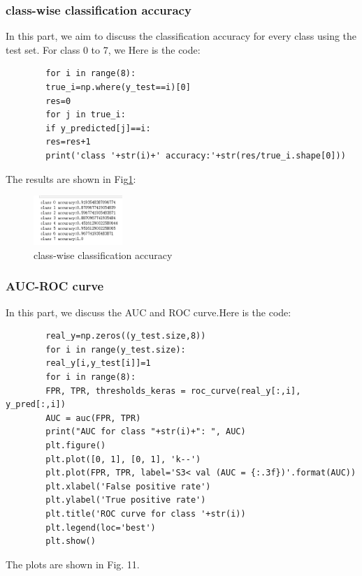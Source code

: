 \documentclass[conference]{IEEEtran}
\begin{document}
	\subsubsection{class-wise classification accuracy}
	In this part, we aim to discuss the classification accuracy for every class using the test set. For class 0 to 7, we 
    Here is the code:
	\begin{lstlisting}
		for i in range(8):
		true_i=np.where(y_test==i)[0]
		res=0
		for j in true_i:
		if y_predicted[j]==i:
		res=res+1
		print('class '+str(i)+' accuracy:'+str(res/true_i.shape[0]))
	\end{lstlisting}
	The results are shown in Fig\ref{Fig.t3q2}:
	\begin{figure}[h] 
		\centering
		\includegraphics[width=0.3\textwidth]{T3Q1b.png}
		\caption{class-wise classification accuracy} 
		\label{Fig.t3q2} 
	\end{figure}
	\subsubsection{AUC-ROC curve}
	In this part, we discuss the AUC and ROC curve.Here is the code:
	\begin{lstlisting}
		real_y=np.zeros((y_test.size,8))
		for i in range(y_test.size):
		real_y[i,y_test[i]]=1
		for i in range(8):
		FPR, TPR, thresholds_keras = roc_curve(real_y[:,i], y_pred[:,i]) 
		AUC = auc(FPR, TPR)  
		print("AUC for class "+str(i)+": ", AUC)
		plt.figure()
		plt.plot([0, 1], [0, 1], 'k--')
		plt.plot(FPR, TPR, label='S3< val (AUC = {:.3f})'.format(AUC))
		plt.xlabel('False positive rate')
		plt.ylabel('True positive rate')
		plt.title('ROC curve for class '+str(i))
		plt.legend(loc='best')
		plt.show()    
	\end{lstlisting}
	
	The plots are shown in Fig. 11.
	
\end{document}
